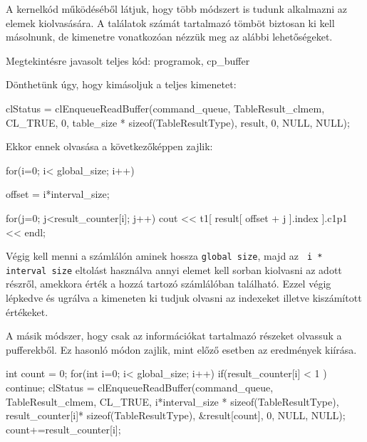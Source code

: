 \newpage
{}
A kernelkód működéséből látjuk, hogy több módszert is tudunk alkalmazni az elemek kiolvasására. A találatok számát tartalmazó tömböt biztosan ki kell másolnunk, de kimenetre vonatkozóan nézzük meg az alábbi lehetőségeket.

Megtekintésre javasolt teljes kód: programok, cp\_buffer

Dönthetünk úgy, hogy kimásoljuk a teljes kimenetet:
\begin{python}
clStatus = clEnqueueReadBuffer(command_queue, TableResult_clmem, 
	CL_TRUE, 0, table_size * sizeof(TableResultType), result, 
	0, NULL, NULL);
\end{python}
Ekkor ennek olvasása a következőképpen zajlik:
\begin{python}
for(i=0; i< global_size; i++)
{
  offset = i*interval_size;
  
  for(j=0; j<result_counter[i]; j++)
  	cout << t1[ result[ offset + j ].index ].c1p1 << endl;
}
\end{python}
Végig kell menni a számlálón aminek hossza \texttt{global size}, majd az \texttt{ i * interval size} eltolást használva annyi elemet kell sorban kiolvasni az adott részről, amekkora érték a hozzá tartozó számlálóban található. Ezzel végig lépkedve és ugrálva a kimeneten ki tudjuk olvasni az indexeket illetve kiszámított értékeket.

A másik módszer, hogy csak az információkat tartalmazó részeket olvassuk a pufferekből. Ez hasonló módon zajlik, mint előző esetben az eredmények kiírása.

\begin{python}
int count = 0;
for(int i=0; i< global_size; i++)
{
if(result_counter[i] < 1 ) continue; 
clStatus = clEnqueueReadBuffer(command_queue, TableResult_clmem, CL_TRUE, 
	i*interval_size * sizeof(TableResultType),
	result_counter[i]* sizeof(TableResultType), 
	&result[count], 0, NULL, NULL);
	count+=result_counter[i];
}
\end{python}

